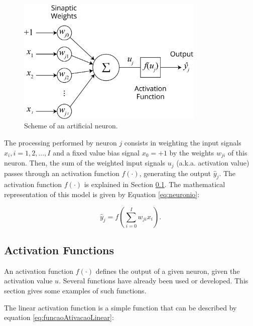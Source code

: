 \begin{figure}[h!]
	\begin{center}
		\includegraphics[width=0.8\textwidth]{"Part 3 - Learning Systems/Supervised Learning/Multilayer Perceptron/figures/neuronioArtificial_v2@4x.png"}
	\end{center}
	\caption{Scheme of an artificial neuron.}
	\label{fig:neuronio}
\end{figure}

The processing performed by neuron $j$ consists in weighting the input signals $x_i , i=1, 2,..., I$ and a fixed value bias signal $x_0=+1$ by the weights $w_{ji}$ of this neuron. Then, the sum of the weighted input signals $u_j$ (a.k.a. activation value) passes through an activation function $f(\cdot)$, generating the output $\hat{y}_j$. The activation function $f(\cdot)$ is explained in Section \ref{ssec:ativacao}. The mathematical representation of this model is given by Equation \ref{eq:neuronio}:


\begin{equation}
    \label{eq:neuronio}
    \hat{y}_j = f \left( \sum_{i=0}^I w_{ji} x_i  \right).
\end{equation}

\subsection{Activation Functions}
\label{ssec:ativacao}

An activation function $f(\cdot)$ defines the output of a given neuron, given the activation value $u$. Several functions have already been used or developed. This section gives some examples of such functions.

The linear activation function is a simple function that can be described by equation \ref{eq:funcaoAtivacaoLinear}: 

